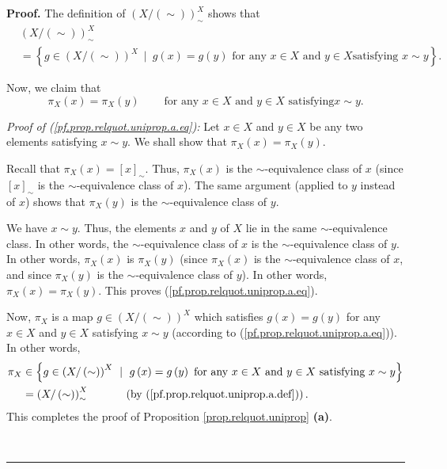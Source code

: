 \documentclass[numbers=enddot,12pt,final,onecolumn,notitlepage]{scrartcl}%
\theoremstyle{definition}
\newenvironment{proof}[1][Proof]{\noindent\textbf{#1.} }{\ \rule{0.5em}{0.5em}}
\newenvironment{verlong}{}{}
\begin{document}
\begin{verlong}
\begin{proof}
The definition of $\left(  X/\left(  \sim\right)  \right)  _{\sim}^{X}$ shows
that%
\begin{align}
&  \left(  X/\left(  \sim\right)  \right)  _{\sim}^{X}\nonumber\\
&  =\left\{  g\in\left(  X/\left(  \sim\right)  \right)  ^{X}\ \mid\ g\left(
x\right)  =g\left(  y\right)  \text{ for any }x\in X\text{ and }y\in X\text{
satisfying }x\sim y\right\}  . \label{pf.prop.relquot.uniprop.a.def}%
\end{align}


Now, we claim that
\begin{equation}
\pi_{X}\left(  x\right)  =\pi_{X}\left(  y\right)
\ \ \ \ \ \ \ \ \ \ \text{for any }x\in X\text{ and }y\in X\text{ satisfying
}x\sim y. \label{pf.prop.relquot.uniprop.a.eq}%
\end{equation}


\textit{Proof of (\ref{pf.prop.relquot.uniprop.a.eq}):} Let $x\in X$ and $y\in
X$ be any two elements satisfying $x\sim y$. We shall show that $\pi
_{X}\left(  x\right)  =\pi_{X}\left(  y\right)  $.

Recall that $\pi_{X}\left(  x\right)  =\left[  x\right]  _{\sim}$. Thus,
$\pi_{X}\left(  x\right)  $ is the $\sim$-equivalence class of $x$ (since
$\left[  x\right]  _{\sim}$ is the $\sim$-equivalence class of $x$). The same
argument (applied to $y$ instead of $x$) shows that $\pi_{X}\left(  y\right)
$ is the $\sim$-equivalence class of $y$.

We have $x\sim y$. Thus, the elements $x$ and $y$ of $X$ lie in the same
$\sim$-equivalence class. In other words, the $\sim$-equivalence class of $x$
is the $\sim$-equivalence class of $y$. In other words, $\pi_{X}\left(
x\right)  $ is $\pi_{X}\left(  y\right)  $ (since $\pi_{X}\left(  x\right)  $
is the $\sim$-equivalence class of $x$, and since $\pi_{X}\left(  y\right)  $
is the $\sim$-equivalence class of $y$). In other words, $\pi_{X}\left(
x\right)  =\pi_{X}\left(  y\right)  $. This proves
(\ref{pf.prop.relquot.uniprop.a.eq}).

Now, $\pi_{X}$ is a map $g\in\left(  X/\left(  \sim\right)  \right)  ^{X}$
which satisfies $g\left(  x\right)  =g\left(  y\right)  $ for any $x\in X$ and
$y\in X$ satisfying $x\sim y$ (according to
(\ref{pf.prop.relquot.uniprop.a.eq})). In other words,%
\begin{align*}
\pi_{X}  &  \in\left\{  g\in\left(  X/\left(  \sim\right)  \right)  ^{X}%
\ \mid\ g\left(  x\right)  =g\left(  y\right)  \text{ for any }x\in X\text{
and }y\in X\text{ satisfying }x\sim y\right\} \\
&  =\left(  X/\left(  \sim\right)  \right)  _{\sim}^{X}%
\ \ \ \ \ \ \ \ \ \ \left(  \text{by (\ref{pf.prop.relquot.uniprop.a.def}%
)}\right)  .
\end{align*}
This completes the proof of Proposition \ref{prop.relquot.uniprop}
\textbf{(a)}.


\end{proof}
\end{verlong}
\end{document}
